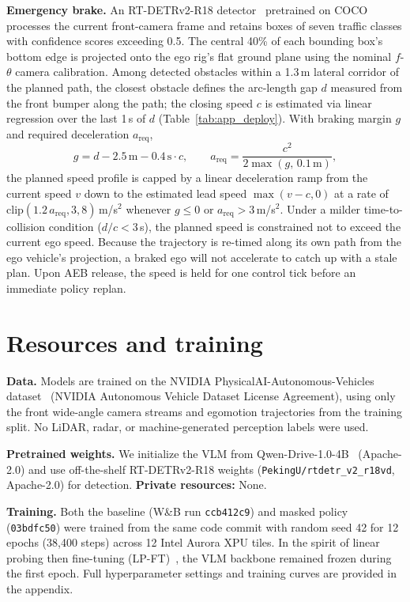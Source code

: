 \documentclass{article}
\begin{document}
\textbf{Emergency brake.} An RT-DETRv2-R18 detector~\cite{rtdetrv2,rtdetr} pretrained on COCO~\cite{coco} processes the current front-camera frame and retains boxes of seven traffic classes with confidence scores exceeding 0.5. The central 40\% of each bounding box's bottom edge is projected onto the ego rig's flat ground plane using the nominal $f$-$\theta$ camera calibration. Among detected obstacles within a 1.3\,m lateral corridor of the planned path, the closest obstacle defines the arc-length gap $d$ measured from the front bumper along the path; the closing speed $c$ is estimated via linear regression over the last 1\,s of $d$ (Table~\ref{tab:app_deploy}). With braking margin $g$ and required deceleration $a_\mathrm{req}$,
\begin{equation}
g = d - 2.5\,\mathrm{m} - 0.4\,\mathrm{s}\cdot c, \qquad a_\mathrm{req} = \frac{c^2}{2\max(g,\,0.1\,\mathrm{m})},
\end{equation}
the planned speed profile is capped by a linear deceleration ramp from the current speed $v$ down to the estimated lead speed $\max(v-c,0)$ at a rate of $\mathrm{clip}(1.2\,a_\mathrm{req},3,8)$\,m/s$^2$ whenever $g\le 0$ or $a_\mathrm{req}>3$\,m/s$^2$. Under a milder time-to-collision condition ($d/c<3$\,s), the planned speed is constrained not to exceed the current ego speed. Because the trajectory is re-timed along its own path from the ego vehicle's projection, a braked ego will not accelerate to catch up with a stale plan. Upon AEB release, the speed is held for one control tick before an immediate policy replan.

\section{Resources and training}
\textbf{Data.} Models are trained on the NVIDIA PhysicalAI-Autonomous-Vehicles dataset~\cite{paiav} (NVIDIA Autonomous Vehicle Dataset License Agreement), using only the front wide-angle camera streams and egomotion trajectories from the training split. No LiDAR, radar, or machine-generated perception labels were used.

\textbf{Pretrained weights.} We initialize the VLM from Qwen-Drive-1.0-4B~\cite{qwendrive} (Apache-2.0) and use off-the-shelf RT-DETRv2-R18 weights (\texttt{PekingU/rtdetr\_v2\_r18vd}, Apache-2.0) for detection. \textbf{Private resources:} None.

\textbf{Training.} Both the baseline (W\&B run \texttt{ccb412c9}) and masked policy (\texttt{03bdfc50}) were trained from the same code commit with random seed 42 for 12 epochs (38{,}400 steps) across 12 Intel Aurora XPU tiles. In the spirit of linear probing then fine-tuning (LP-FT)~\cite{lpft}, the VLM backbone remained frozen during the first epoch. Full hyperparameter settings and training curves are provided in the appendix.
\end{document}
